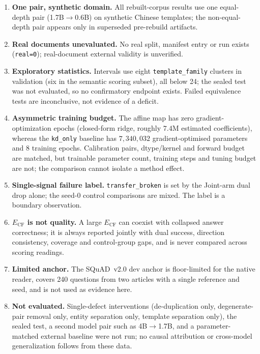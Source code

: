 \documentclass[11pt,twocolumn]{article}
\begin{document}
\begin{enumerate}
\item \textbf{One pair, synthetic domain.} All rebuilt-corpus results use one
      equal-depth pair (1.7B$\to$0.6B) on synthetic Chinese templates; the
      non-equal-depth pair appears only in superseded pre-rebuild artifacts.
\item \textbf{Real documents unevaluated.} No real split, manifest entry or run
      exists (\texttt{real=0}); real-document external validity is unverified.
\item \textbf{Exploratory statistics.} Intervals use eight
      \texttt{template\_family} clusters in validation (six in the semantic
      scoring subset), all below 24; the sealed test was not evaluated, so no
      confirmatory endpoint exists. Failed equivalence tests are inconclusive,
      not evidence of a deficit.
\item \textbf{Asymmetric training budget.} The affine map has zero
      gradient-optimization epochs (closed-form ridge, roughly $7.4$M estimated
      coefficients), whereas the \texttt{kd\_only} baseline has $7{,}340{,}032$
      gradient-optimised parameters and $8$ training epochs. Calibration pairs,
      dtype/kernel and forward budget are matched, but trainable parameter
      count, training steps and tuning budget are not; the comparison cannot
      isolate a method effect.
\item \textbf{Single-signal failure label.} \texttt{transfer\_broken} is set by
      the Joint-arm dual drop alone; the seed-0 control comparisons are mixed.
      The label is a boundary observation.
\item \textbf{$E_{\mathrm{CF}}$ is not quality.} A large $E_{\mathrm{CF}}$ can
      coexist with collapsed answer correctness; it is always reported jointly
      with dual success, direction consistency, coverage and control-group
      gaps, and is never compared across scoring readings.
\item \textbf{Limited anchor.} The SQuAD~v2.0 dev anchor is floor-limited for
      the native reader, covers 240 questions from two articles with a single
      reference and seed, and is not used as evidence here.
\item \textbf{Not evaluated.} Single-defect interventions (de-duplication only,
      degenerate-pair removal only, entity separation only, template separation
      only), the sealed test, a second model pair such as 4B$\to$1.7B, and a
      parameter-matched external baseline were not run; no causal attribution
      or cross-model generalization follows from these data.
\end{enumerate}
\end{document}
